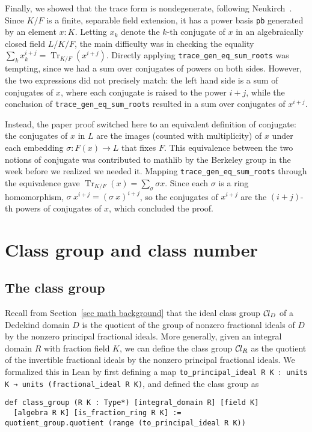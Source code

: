 \documentclass[sn-mathphys]{sn-jnl}%
\newcommand{\lean}[1]{\texttt{#1}\xspace}
\newcommand*{\Cl}{\mathcal{C}\kern-.075em l}
\DeclareMathOperator{\Tr}{Tr}
\newcommand{\mathlib}{\textsf{mathlib}\xspace}
\begin{document}
Finally, we showed that the trace form is nondegenerate, following Neu\-kirch~\cite[Proposition~2.8]{Neukirch}.
Since $K / F$ is a finite, separable field extension, it has a power basis \lean{pb} generated by an element $x : K$.
Letting $x_k$ denote the $k$-th conjugate of $x$ in an algebraically closed field $L / K / F$,
the main difficulty was in checking the equality $\sum_k x_k^{i + j} = \Tr_{K / F} (x^{i + j})$.
Directly applying \lean{trace\_gen\_eq\_sum\_roots} was tempting, since we had a sum over conjugates of powers on both sides.
However, the two expressions did not precisely match: the left hand side is a sum of conjugates of $x$, where each conjugate is raised to the power $i + j$,
while the conclusion of \lean{trace\_gen\_eq\_sum\_roots} resulted in a sum over conjugates of $x^{i + j}$.

Instead, the paper proof switched here to an equivalent definition of conjugate:
the conjugates of $x$ in $L$ are the images (counted with multiplicity) of $x$ under each embedding $\sigma \colon F(x) \to L$ that fixes $F$. This equivalence between the two notions of conjugate was contributed to \mathlib by the Berkeley group in the week before we realized we needed it. Mapping \lean{trace\_gen\_eq\_sum\_roots} through the equivalence gave
$\Tr_{K / F}(x) = \sum_{\sigma} \sigma x$.
Since each $\sigma$ is a ring homomorphism, $\sigma\ x^{i + j} = (\sigma\ x)^{i + j}$,
so the conjugates of $x^{i + j}$ are the $(i + j)$-th powers of conjugates of $x$, which concluded the proof.

\section{Class group and class number} \label{sec:class-number}

\subsection{The class group}\label{subsec:class_group}

Recall from Section~\ref{sec math background} that the ideal class group $\Cl_D$ of a Dedekind domain $D$ is the quotient of the group of nonzero fractional ideals of $D$ by the nonzero principal fractional ideals.
More generally, given an integral domain $R$ with fraction field $K$,
we can define the class group $\Cl_R$ as the quotient of the invertible fractional ideals by the nonzero principal fractional ideals.
We formalized this in Lean by first defining a map \lean{to\_principal\_ideal R K $:$ units K → units (fractional\_ideal R K)},
and defined the class group as
\begin{lstlisting}
def class_group (R K : Type*) [integral_domain R] [field K]
  [algebra R K] [is_fraction_ring R K] :=
quotient_group.quotient (range (to_principal_ideal R K))
\end{lstlisting}
\end{document}

